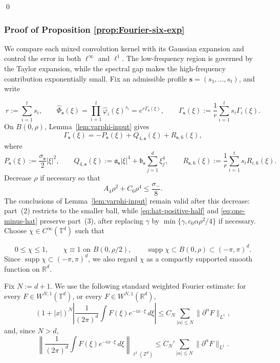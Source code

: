 \documentclass[letterpaper,11pt,reqno]{amsart}
\theoremstyle{definition}
\DeclareMathOperator\supp{supp}
\newcommand{\vs}{\mathbf{s}}\newcommand{\vt}{\mathbf{t}}\newcommand{\vu}{\mathbf{u}}
\begin{document}
\qed




\smallskip
\subsubsection*{Proof of Proposition \ref{prop:Fourier-six-exp}}
We compare each mixed convolution kernel with
its Gaussian expansion and control the error in both \(\ell^\infty\) and \(\ell^1\). The
low-frequency region is governed by the Taylor expansion, while the spectral gap makes the
high-frequency contribution exponentially small.
Fix an admissible profile \(\vs=(s_1,\dots,s_t)\), and write


\[
r:=\sum_{i=1}^t s_i,\qquad
\widehat\Phi_{\vs}(\xi)
=
\prod_{i=1}^t \widehat\varphi_i(\xi)^{s_i}
=
e^{r\Gamma_{\vs}(\xi)},
\qquad
\Gamma_{\vs}(\xi):=\frac1r\sum_{i=1}^t s_i\Gamma_i(\xi).
\]
On \(B(0,\rho)\), Lemma~\ref{lem:varphi-input} gives
\[
\Gamma_{\vs}(\xi)
=
-P_{\vs}(\xi)+Q_{4,\vs}(\xi)+R_{\vs,6}(\xi),
\]
where
\[
P_{\vs}(\xi):=\frac{\sigma_{\vs}}2|\xi|^2,
\qquad
Q_{4,\vs}(\xi):=\mathfrak a_{\vs}|\xi|^4+\mathfrak b_{\vs}\sum_{j=1}^d \xi_j^4,
\qquad
R_{\vs,6}(\xi):=\frac1r\sum_{i=1}^t s_iR_{i,6}(\xi).
\]
Decrease \(\rho\) if necessary so that
\[
A_4\rho^2+C_6\rho^4\le \frac{\sigma_-}{8}.
\]
The conclusions of Lemma~\ref{lem:varphi-input} remain valid after this decrease: part~(2)
restricts to the smaller ball, while \eqref{eq:hat-positive-half} and
\eqref{eq:one-minus-hat} preserve part~(3), after replacing \(\gamma\) by
\(\min\{\gamma,c_0\alpha\rho^2/4\}\) if necessary.
Choose \(\chi\in C^\infty(\mathbb T^d)\) such that

\[
0\le \chi\le1,\qquad
\chi\equiv1 \text{ on }B(0,\rho/2),\qquad
\supp\chi\subset B(0,\rho)\subset(-\pi,\pi)^d.
\]
Since \(\operatorname{supp}\chi\subset(-\pi,\pi)^d\), we also regard \(\chi\) as a compactly supported smooth function on \(\mathbb R^d\). 

Fix \(N:=d+1\). We use the following standard weighted Fourier estimate: for every
\(F\in W^{N,1}(\mathbb T^d)\), or every \(F\in W^{N,1}(\mathbb R^d)\),
\begin{equation}\label{eq:weighted-Fourier}
(1+|x|)^N\left|
\frac1{(2\pi)^d}\int F(\xi)e^{-ix\cdot\xi}\,d\xi
\right|
\le
C_N\sum_{|\alpha|\le N}\|\partial^\alpha F\|_{L^1},
\end{equation}
and, since \(N>d\),
\begin{equation}\label{eq:weighted-Fourier-l1}
\left\|
\frac1{(2\pi)^d}\int F(\xi)e^{-ix\cdot\xi}\,d\xi
\right\|_{\ell^1(\mathbb Z^d)}
\le
C_N'\sum_{|\alpha|\le N}\|\partial^\alpha F\|_{L^1}.
\end{equation}
\end{document}
